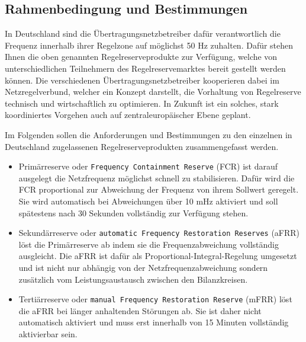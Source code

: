 \subsection{Rahmenbedingung und Bestimmungen}

In Deutschland sind die Übertragungsnetzbetreiber dafür verantwortlich die Frequenz innerhalb ihrer Regelzone auf möglichst
50 Hz zuhalten.
Dafür stehen Ihnen die oben genannten Regelreserveprodukte zur Verfügung, welche von unterschiedlichen Teilnehmern
des Regelreservemarktes bereit gestellt werden können.
Die verschiedenen Übertragungsnetzbetreiber kooperieren dabei im Netzregelverbund, welcher ein Konzept darstellt,
die Vorhaltung von Regelreserve technisch und wirtschaftlich zu optimieren.
In Zukunft ist ein solches, stark koordiniertes Vorgehen auch auf zentraleuropäischer Ebene geplant.

Im Folgenden sollen die Anforderungen und Bestimmungen zu den einzelnen in Deutschland zugelassenen Regelreserveprodukten 
zusammengefasst werden.

\begin{itemize}
    \item Primärreserve oder \texttt{Frequency Containment Reserve} (FCR) ist darauf ausgelegt die Netzfrequenz möglichst schnell zu stabilisieren. Dafür wird die FCR proportional zur Abweichung der Frequenz von ihrem Sollwert geregelt. Sie wird automatisch bei Abweichungen über 10 mHz aktiviert und soll spätestens nach 30 Sekunden vollständig zur Verfügung stehen.
    \item Sekundärreserve oder \texttt{automatic Frequency Restoration Reserves} (aFRR) löst die Primärreserve ab indem sie die Frequenzabweichung vollständig ausgleicht. Die aFRR ist dafür als Proportional-Integral-Regelung umgesetzt und ist nicht nur abhängig von der Netzfrequenzabweichung sondern zusätzlich vom Leistungsaustausch zwischen den Bilanzkreisen.
    \item Tertiärreserve oder \texttt{manual Frequency Restoration Reserve} (mFRR) löst die aFRR bei länger anhaltenden Störungen ab. Sie ist daher nicht automatisch aktiviert und muss erst innerhalb von 15 Minuten vollständig aktivierbar sein.
\end{itemize}


